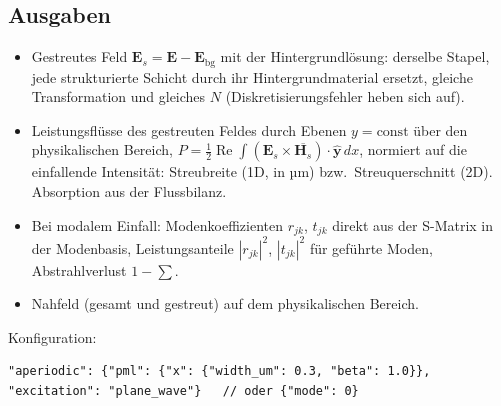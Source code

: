 \subsection{Ausgaben}
\begin{itemize}[nosep]
  \item Gestreutes Feld $\mathbf E_s=\mathbf E-\mathbf E_{\text{bg}}$ mit der Hintergrundlösung: derselbe Stapel, jede
        strukturierte Schicht durch ihr Hintergrundmaterial ersetzt, gleiche Transformation und gleiches $N$
        (Diskretisierungsfehler heben sich auf).
  \item Leistungsflüsse des gestreuten Feldes durch Ebenen $y=\text{const}$ über den physikalischen Bereich,
        $P=\tfrac12\operatorname{Re}\int(\mathbf E_s\times\overline{\mathbf H_s})\cdot\hat{\mathbf y}\,dx$, normiert auf die
        einfallende Intensität: Streubreite (1D, in µm) bzw.\ Streuquerschnitt (2D). Absorption aus der Flussbilanz.
  \item Bei modalem Einfall: Modenkoeffizienten $r_{jk}$, $t_{jk}$ direkt aus der S-Matrix in der Modenbasis,
        Leistungsanteile $|r_{jk}|^2$, $|t_{jk}|^2$ für geführte Moden, Abstrahlverlust $1-\sum$.
  \item Nahfeld (gesamt und gestreut) auf dem physikalischen Bereich.
\end{itemize}
Konfiguration:
{\footnotesize\begin{verbatim}
"aperiodic": {"pml": {"x": {"width_um": 0.3, "beta": 1.0}}, "excitation": "plane_wave"}   // oder {"mode": 0}
\end{verbatim}}


